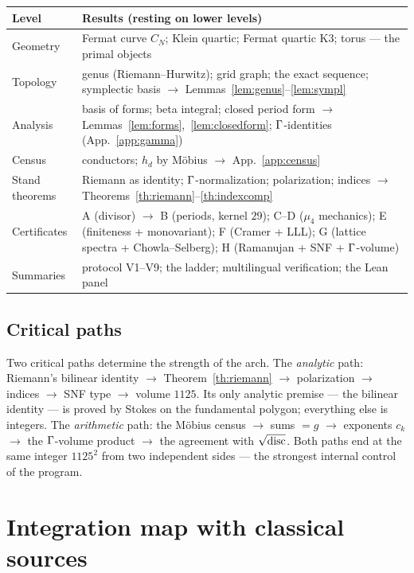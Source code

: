 \begin{center}
\small
\begin{tabularx}{\textwidth}{@{}l >{\raggedright\arraybackslash}X@{}}
\toprule
Level & Results (resting on lower levels) \\
\midrule
Geometry & Fermat curve $C_N$; Klein quartic; Fermat quartic K3;
  torus --- the primal objects \\
Topology & genus (Riemann--Hurwitz); grid graph; the exact
  sequence; symplectic basis $\to$
  Lemmas~\ref{lem:genus}--\ref{lem:sympl} \\
Analysis & basis of forms; beta integral; closed period form $\to$
  Lemmas~\ref{lem:forms},~\ref{lem:closedform}; $\Gamma$-identities
  (App.~\ref{app:gamma}) \\
Census & conductors; $h_d$ by M\"obius $\to$ App.~\ref{app:census} \\
Stand theorems & Riemann as identity; $\Gamma$-normalization;
  polarization; indices $\to$
  Theorems~\ref{th:riemann}--\ref{th:indexcomp} \\
Certificates & A (divisor) $\to$ B (periods, kernel $29$);
  C--D ($\mu_4$ mechanics); E (finiteness + monovariant);
  F (Cramer + LLL); G (lattice spectra + Chowla--Selberg);
  H (Ramanujan + SNF + $\Gamma$-volume) \\
Summaries & protocol V1--V9; the ladder; multilingual
  verification; the Lean panel \\
\bottomrule
\end{tabularx}
\end{center}

\subsection{Critical paths}

Two critical paths determine the strength of the arch. The
\emph{analytic} path: Riemann's bilinear identity $\to$
Theorem~\ref{th:riemann} $\to$ polarization $\to$ indices $\to$ SNF
type $\to$ volume $1125$. Its only analytic premise --- the bilinear
identity --- is proved by Stokes on the fundamental polygon;
everything else is integers. The \emph{arithmetic} path: the
M\"obius census $\to$ sums $=g$ $\to$ exponents $c_k$ $\to$ the
$\Gamma$-volume product $\to$ the agreement with $\sqrt{\operatorname{disc}}$. Both
paths end at the same integer $1125^2$ from two independent sides
--- the strongest internal control of the program.

\section{Integration map with classical sources}\label{app:integration}

